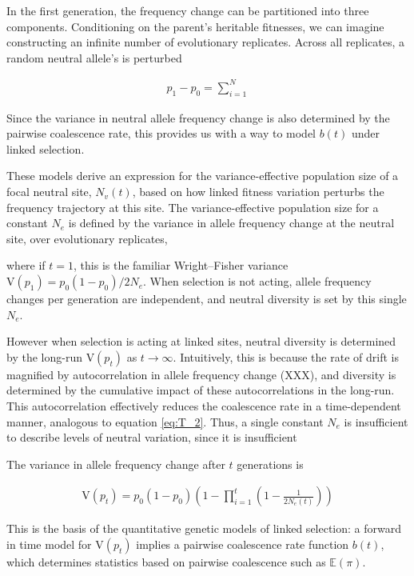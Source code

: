 \documentclass[11pt]{article}
\newcommand{\E}{\mathbb{E}}
\newcommand{\V}{\text{V}}
\begin{document}
In the first generation, the frequency change
can be partitioned into three components. Conditioning on the parent's
heritable fitnesses, we can imagine constructing an infinite number of
evolutionary replicates. Across all replicates, a random neutral allele's is
perturbed 

\begin{align}
  p_1 - p_0 = \sum_{i=1}^{N} 
\end{align}



Since the variance in neutral allele frequency change is also determined by the
pairwise coalescence rate, this provides us with a way to model $b(t)$ under
linked selection.




These models derive an expression for the variance-effective population size of
a focal neutral site, $N_v(t)$, based on how linked fitness variation perturbs
the frequency trajectory at this site.  The variance-effective population size
for a constant $N_e$ is defined by the variance in allele frequency change at
the neutral site, over evolutionary replicates, 

where if $t=1$, this is the familiar Wright--Fisher variance $\V(p_1) =
p_0(1-p_0) / 2N_e$. When selection is not acting, allele frequency changes per
generation are independent, and neutral diversity is set by this
single $N_e$. 

However when selection is acting at linked sites, neutral diversity is
determined by the long-run $\V(p_t)$ as $t \to \infty$. Intuitively, this is
because the rate of drift is magnified by autocorrelation in allele frequency
change (XXX), and diversity is determined by the cumulative impact of these
autocorrelations in the long-run. This autocorrelation effectively reduces the
coalescence rate in a time-dependent manner, analogous to equation
\eqref{eq:T_2}. Thus, a single constant $N_e$ is insufficient to describe
levels of neutral variation, since it is insufficient 

The variance in allele frequency change after $t$ generations is

\begin{align}
  \V(p_t) = p_0(1-p_0)\left(1 - \prod_{i=1}^t \left(1-\frac{1}{2N_e(t)}\right)\right)
\end{align}

This is the basis of the quantitative genetic models of linked selection: a
forward in time model for $\V(p_t)$ implies a pairwise coalescence rate
function $b(t)$, which determines statistics based on pairwise coalescence such
as $\E(\pi)$.
\end{document}
